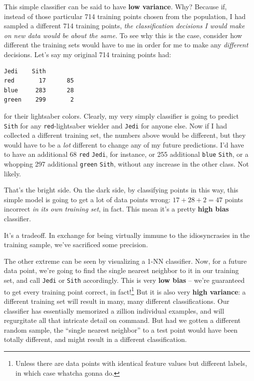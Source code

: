 This simple classifier can be said to have \textbf{low variance}. Why? Because
if, instead of those particular 714 training points chosen from the
population, I had sampled a different 714 training points, \textit{the
classification decisions I would make on new data would be about the same.} To
see why this is the case, consider how different the training sets would have
to me in order for me to make any \textit{different} decisions. Let's say my
original 714 training points had:

\begin{center}
\begin{Verbatim}[fontsize=\small,samepage=true,frame=none]
        Jedi    Sith
red       17      85
blue     283      28
green    299       2
\end{Verbatim}
\end{center}

for their lightsaber colors. Clearly, my very simply classifier is going to
predict \texttt{Sith} for any \texttt{red}-lightsaber wielder and
\texttt{Jedi} for anyone else. Now if I had collected a different training
set, the numbers above would be different, but they would have to be a
\textit{lot} different to change any of my future predictions. I'd have to
have an additional 68 \texttt{red} \texttt{Jedi}, for instance, or 255
additional \texttt{blue} \texttt{Sith}, or a whopping 297 additional
\texttt{green} \texttt{Sith}, without any increase in the other class. Not
likely.

That's the bright side. On the dark side, by classifying points in this way,
this simple model is going to get a lot of data points wrong: $17+28+2=47$
points incorrect \textit{in its own training set}, in fact. This mean it's a
pretty \textbf{high bias} classifier.

It's a tradeoff. In exchange for being virtually immune to the idiosyncrasies
in the training sample, we've sacrificed some precision.

The other extreme can be seen by visualizing a 1-NN classifier. Now, for a
future data point, we're going to find the single nearest neighbor to it in
our training set, and call \texttt{Jedi} or \texttt{Sith} accordingly. This is
very \textbf{low bias} -- we're guaranteed to get every training point
correct, in fact!\footnote{Unless there are data points with identical feature
values but different labels, in which case whatcha gonna do.} But it is also
very \textbf{high variance}: a different training set will result in many,
many different classifications. Our classifier has essentially memorized a
zillion individual examples, and will regurgitate all that intricate detail on
command. But had we gotten a different random sample, the ``single nearest
neighbor'' to a test point would have been totally different, and might result
in a different classification.
     
